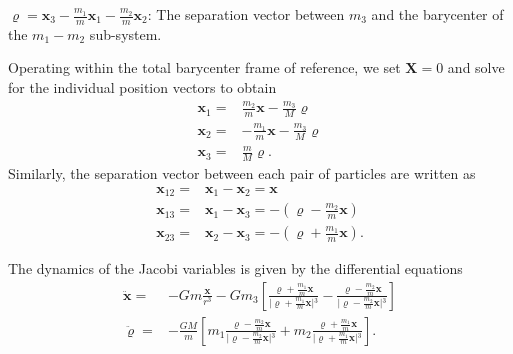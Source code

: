 $\boldsymbol{\varrho} = \textbf{x}_3 - \frac{m_1}{m}\textbf{x}_1 - \frac{m_2}{m}\textbf{x}_2$: The separation vector between $m_3$ and the barycenter of the $m_1-m_2$ sub-system.


Operating within the total barycenter frame of reference, we set $\textbf{X} = 0$ and solve for the individual position vectors to obtain
\begin{subequations}
    \begin{align}
        \textbf{x}_{1} = &\frac{m_{2}}{m}\textbf{x}-\frac{m_{3}}{M}\boldsymbol{\varrho}\\
        \textbf{x}_{2} = &-\frac{m_{1}}{m}\textbf{x}-\frac{m_{3}}{M}\boldsymbol{\varrho}\\
        \textbf{x}_{3} = &\frac{m}{M}\boldsymbol{\varrho}.
    \end{align} \label{eq:Coordinates3BodyJacobi}
\end{subequations}
Similarly, the separation vector between each pair of particles are written as
\begin{subequations}
    \begin{align}
        \textbf{x}_{12} =& \textbf{x}_1 - \textbf{x}_2 = \textbf{x}\\
        \textbf{x}_{13} =& \textbf{x}_1 - \textbf{x}_3 = -\left( \boldsymbol{\varrho} - \frac{m_2}{m} \textbf{x} \right)\\
        \textbf{x}_{23} =& \textbf{x}_2 - \textbf{x}_3 = -\left( \boldsymbol{\varrho} + \frac{m_1}{m} \textbf{x} \right).
    \end{align}
\end{subequations}

The dynamics of the Jacobi variables is given by the differential equations
\begin{subequations}
    \begin{align}
        \ddot{\textbf{x}} =& -Gm\frac{\textbf{x}}{r^3} - Gm_3 \left[ \frac{\boldsymbol{\varrho} + \frac{m_1}{m}\textbf{x}}{\vert{} \boldsymbol{\varrho} + \frac{m_1}{m}\textbf{x}\vert{}^3} - \frac{\boldsymbol{\varrho} - \frac{m_2}{m}\textbf{x}}{\vert{} \boldsymbol{\varrho} - \frac{m_2}{m}\textbf{x}\vert{}^3}\right]\\
        \ddot{\boldsymbol{\varrho}} = &- \frac{GM}{m} \left[ m_1 \frac{\boldsymbol{\varrho} - \frac{m_2}{m}\textbf{x}}{\vert{} \boldsymbol{\varrho} - \frac{m_2}{m}\textbf{x}\vert{}^3} + m_2 \frac{\boldsymbol{\varrho} + \frac{m_1}{m}\textbf{x}}{\vert{} \boldsymbol{\varrho} + \frac{m_1}{m}\textbf{x}\vert{}^3} \right].
    \end{align} \label{eq:EoM3BodiesJacobi}
\end{subequations}

